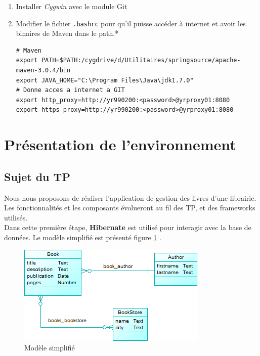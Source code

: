 \documentclass[small,algo]{dushClass}
\begin{document}
\begin{enumerate}
\item Installer \emph{Cygwin} avec le module Git
\item Modifier le fichier \texttt{.bashrc} pour qu'il puisse accéder à internet et avoir les binaires de Maven dans le path.*
\lstset{language=BASH}
\begin{lstlisting}
# Maven
export PATH=$PATH:/cygdrive/d/Utilitaires/springsource/apache-maven-3.0.4/bin
export JAVA_HOME="C:\Program Files\Java\jdk1.7.0"
# Donne acces a internet a GIT
export http_proxy=http://yr990200:<password>@yrproxy01:8080
export https_proxy=http://yr990200:<password>@yrproxy01:8080
\end{lstlisting}
\end{enumerate}
\lstset{language=JAVA}



\section{Présentation de l'environnement}

\subsection{Sujet du TP}

Nous nous proposons de réaliser l'application de gestion des livres d'une librairie. Les fonctionnalités et les composants évolueront au fil des TP, et des frameworks utilisés.\\

Dans cette première étape, \textbf{Hibernate} est utilisé pour interagir avec la base de données. Le modèle simplifié est présenté figure \ref{model-base} .

\begin{figure}[ht]
	\center
	\includegraphics{images/simple_model.png}
	\caption{Modèle simplifié}\label{model-base}
\end{figure}
\end{document}
